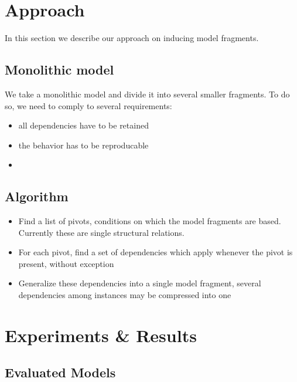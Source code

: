 \documentclass{article}
\begin{document}
\section{Approach}
In this section we describe our approach on inducing model fragments.

\subsection{Monolithic model}

We take a monolithic model and divide it into several smaller fragments. To do
so, we need to comply to several requirements:

\begin{itemize}
\item all dependencies have to be retained

\item the behavior has to be reproducable

\item 

\end{itemize}

\subsection{Algorithm}

\begin{itemize}

\item Find a list of pivots, conditions on which the model fragments are based.
Currently these are single structural relations.

\item For each pivot, find a set of dependencies which apply whenever the pivot
is present, without exception

\item Generalize these dependencies into a single model fragment, several
dependencies among instances may be compressed into one

\end{itemize}

\section{Experiments \& Results}
\subsection{Evaluated Models}
\end{document}
